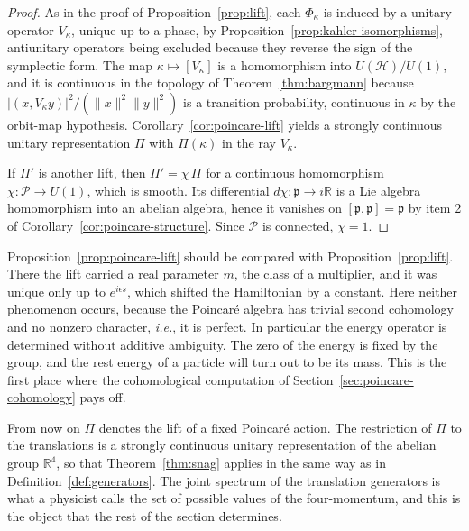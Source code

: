 	\begin{proof}
		As in the proof of Proposition~\ref{prop:lift}, each $\Phi_\kappa$ is induced by a unitary operator $V_\kappa$, unique up to a phase, by Proposition~\ref{prop:kahler-isomorphisms}, antiunitary operators being excluded because they reverse the sign of the symplectic form. The map $\kappa\mapsto[V_\kappa]$ is a homomorphism into $U(\mathcal{H})/U(1)$, and it is continuous in the topology of Theorem~\ref{thm:bargmann} because $|(x,V_\kappa y)|^2/(\|x\|^2\|y\|^2)$ is a transition probability, continuous in $\kappa$ by the orbit-map hypothesis. Corollary~\ref{cor:poincare-lift} yields a strongly continuous unitary representation $\Pi$ with $\Pi(\kappa)$ in the ray $V_\kappa$.
		
		If $\Pi'$ is another lift, then $\Pi'=\chi\,\Pi$ for a continuous homomorphism $\chi:\mathcal{P}\to U(1)$, which is smooth. Its differential $d\chi:\mathfrak{p}\to i\mathbb{R}$ is a Lie algebra homomorphism into an abelian algebra, hence it vanishes on $[\mathfrak{p},\mathfrak{p}]=\mathfrak{p}$ by item 2 of Corollary~\ref{cor:poincare-structure}. Since $\mathcal{P}$ is connected, $\chi=1$.
	\end{proof}
	
	\begin{remark}\label{rem:no-constant}
		Proposition~\ref{prop:poincare-lift} should be compared with Proposition~\ref{prop:lift}. There the lift carried a real parameter $m$, the class of a multiplier, and it was unique only up to $e^{i\epsilon s}$, which shifted the Hamiltonian by a constant. Here neither phenomenon occurs, because the Poincar\'e algebra has trivial second cohomology and no nonzero character, \textit{i.e.}, it is perfect. In particular the energy operator is determined without additive ambiguity. The zero of the energy is fixed by the group, and the rest energy of a particle will turn out to be its mass. This is the first place where the cohomological computation of Section~\ref{sec:poincare-cohomology} pays off.
	\end{remark}
	
	From now on $\Pi$ denotes the lift of a fixed Poincar\'e action. The restriction of $\Pi$ to the translations is a strongly continuous unitary representation of the abelian group $\mathbb{R}^4$, so that Theorem~\ref{thm:snag} applies in the same way as in Definition~\ref{def:generators}. The joint spectrum of the translation generators is what a physicist calls the set of possible values of the four-momentum, and this is the object that the rest of the section determines.
	
